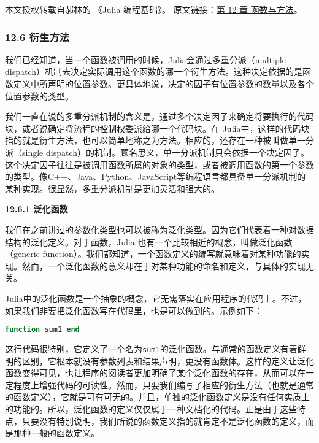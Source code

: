 
本文授权转载自郝林的 《Julia 编程基础》。 原文链接：\href{https://github.com/hyper0x/JuliaBasics/blob/master/book/ch12.md}{第 12 章 函数与方法}。


\subsubsection{12.6 衍生方法}

我们已经知道，当一个函数被调用的时候，Julia会通过多重分派（multiple dispatch）机制去决定实际调用这个函数的哪一个衍生方法。这种决定依据的是函数定义中所声明的位置参数。更具体地说，决定的因子有位置参数的数量以及各个位置参数的类型。

我们一直在说的多重分派机制的含义是，通过多个决定因子来确定将要执行的代码块，或者说确定将流程的控制权委派给哪一个代码块。在 Julia中，这样的代码块指的就是衍生方法，也可以简单地称之为方法。相应的，还存在一种被叫做单一分派（single dispatch）的机制。顾名思义，单一分派机制只会依据一个决定因子。这个决定因子往往是被调用函数所属的对象的类型，或者被调用函数的第一个参数的类型。像C++、Java、Python、JavaScript等编程语言都具备单一分派机制的某种实现。很显然，多重分派机制是更加灵活和强大的。

\textbf{12.6.1 泛化函数}

我们在之前讲过的参数化类型也可以被称为泛化类型。因为它们代表着一种对数据结构的泛化定义。对于函数，Julia 也有一个比较相近的概念，叫做泛化函数（generic function）。我们都知道，一个函数定义的编写就意味着对某种功能的实现。然而，一个泛化函数的意义却在于对某种功能的命名和定义，与具体的实现无关。

Julia中的泛化函数是一个抽象的概念，它无需落实在应用程序的代码上。不过，如果我们非要把泛化函数写在代码里，也是可以做到的。示例如下：

\begin{lstlisting}[language=julia]
function sum1 end
\end{lstlisting}

这行代码很特别，它定义了一个名为\verb|sum1|的泛化函数。与通常的函数定义有着鲜明的区别，它根本就没有参数列表和结果声明，更没有函数体。这样的定义让泛化函数变得可见，也让程序的阅读者更加明确了某个泛化函数的存在，从而可以在一定程度上增强代码的可读性。然而，只要我们编写了相应的衍生方法（也就是通常的函数定义），它就是可有可无的。并且，单独的泛化函数定义是没有任何实质上的功能的。所以，泛化函数的定义仅仅属于一种文档化的代码。正是由于这些特点，只要没有特别说明，我们所说的函数定义指的就肯定不是泛化函数的定义，而是那种一般的函数定义。


